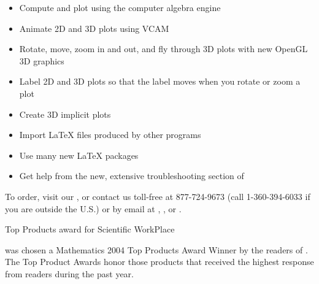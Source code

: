 \documentclass{article}
\begin{document}
\begin{itemize}
\item Compute and plot using the  computer algebra
engine

\item Animate 2D and 3D plots using  VCAM

\item Rotate, move, zoom in and out, and fly through 3D plots with new
OpenGL 3D graphics

\item Label 2D and 3D plots so that the label moves when you rotate or zoom
a plot

\item Create 3D implicit plots

\item Import LaTeX files produced by other programs

\item Use many new LaTeX packages

\item Get help from the new, extensive troubleshooting section of 
\end{itemize}

To order, visit our 
%
, or contact us toll-free at 877-724-9673 (call 1-360-394-6033 if you are
outside the U.S.) or by email at 
%
, 
%
, or 
%
.

\label{award}Top Products award for Scientific WorkPlace

was chosen a Mathematics 2004 Top
Products Award Winner by the readers of . The Top Product Awards honor those products that received the highest
response from readers during the past year.
\end{document}
